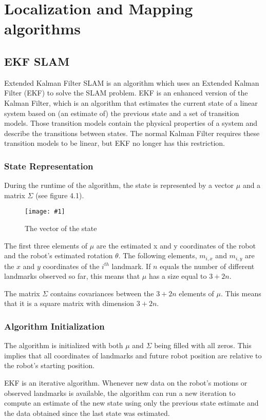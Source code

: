 \documentclass{ba-kecs}
\numberwithin{figure}{section}
\numberwithin{equation}{section}
\newcommand{\dkepic}[2]{ %
	\begin{figure}[H] %
	\texttt{[image: \#1]}
	\caption{#2}
	\label{#1}
	\end{figure}
}
\begin{document}
\section{Localization and Mapping algorithms}

\subsection{EKF SLAM}
Extended Kalman Filter SLAM is an algorithm which uses an Extended Kalman Filter (EKF) to solve the SLAM problem. EKF is an enhanced version of the Kalman Filter, which is an algorithm that estimates the current state of a linear system based on (an estimate of) the previous state and a set of transition models. Those transition models contain the physical properties of a system and describe the transitions between states. The normal Kalman Filter requires these transition models to be linear, but EKF no longer has this restriction.

\subsubsection{State Representation}
During the runtime of the algorithm, the state is represented by a vector $\mu$ and a matrix $\Sigma$ (see figure 4.1).
\dkepic{bigMatrix}{The vector of the state \cite{vec}}
The first three elements of $\mu$ are the estimated x and y coordinates of the robot and the robot’s estimated rotation $\theta$. The following elements, $m_{i,x}$ and $m_{i,y}$ are the $x$ and $y$ coordinates of the $i^{th}$ landmark. If $n$ equals the number of different landmarks observed so far, this means that $\mu$ has a size equal to $3 + 2n$.

The matrix $\Sigma$ contains covariances between the $3 + 2n$ elements of $\mu$. This means that it is a square matrix with dimension $3 + 2n$.

\subsubsection{Algorithm Initialization}
The algorithm is initialized with both $\mu$ and $\Sigma$ being filled with all zeros. This implies that all coordinates of landmarks and future robot position are relative to the robot’s starting position.

EKF is an iterative algorithm. Whenever new data on the robot’s motions or observed landmarks is available, the algorithm can run a new iteration to compute an estimate of the new state using only the previous state estimate and the data obtained since the last state was estimated.
\end{document}
